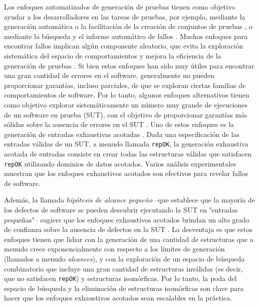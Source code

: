 Los enfoques automatizados de generación de pruebas tienen como objetivo ayudar a los desarrolladores en las tareas de pruebas, por ejemplo, mediante la generación automática o la facilitación de la creación de conjuntos de pruebas \cite{Cadar08,Luckow14,Fraser11}, o mediante la búsqueda y el informe automático de fallos \cite{Pacheco07,Ma15,Godefroid05,Marinov01,Boyapati02,Godefroid12}. Muchos enfoques para encontrar fallos implican algún componente aleatorio, que evita la exploración sistemática del espacio de comportamientos y mejora la eficiencia de la generación de pruebas \cite{Pacheco07,Ma15,Fraser11}. Si bien estos enfoques han sido muy útiles para encontrar una gran cantidad de errores en el software, generalmente no pueden proporcionar garantías, incluso parciales, de que se exploran ciertas familias de comportamientos de software. Por lo tanto, algunos enfoques alternativos tienen como objetivo explorar sistemáticamente un número muy grande de ejecuciones de un software en prueba (SUT), con el objetivo de proporcionar garantías más sólidas sobre la ausencia de errores en el SUT \cite{Marinov01,Boyapati02,Godefroid05,Godefroid18}. Uno de estos enfoques es la generación de entradas exhaustivas acotadas \cite{Marinov01,Boyapati02}. Dada una especificación de las entradas válidas de un SUT, a menudo llamada \texttt{repOK}, la generación exhaustiva acotada de entradas consiste en crear todas las estructuras válidas que satisfacen \texttt{repOK} utilizando dominios de datos acotados. Varios análisis experimentales muestran que los enfoques exhaustivos acotados son efectivos para revelar fallos de software.


Además, la llamada \emph{hipótesis de alcance pequeño} --que establece que la mayoría de los defectos de software se pueden descubrir ejecutando la SUT en "entradas pequeñas"-- sugiere que los enfoques exhaustivos acotados brindan un alto grado de confianza sobre la ausencia de defectos en la SUT \cite{Andoni02}. La desventaja es que estos enfoques tienen que lidiar con la generación de una cantidad de estructuras que a menudo crece exponencialmente con respecto a los límites de generación (llamados a menudo \emph{alcances}), y con la exploración de un espacio de búsqueda combinatorio que incluye una gran cantidad de estructuras inválidas (es decir, que no satisfacen \texttt{repOK}) y estructuras isomórficas. Por lo tanto, la poda del espacio de búsqueda y la eliminación de estructuras isomórficas son clave para hacer que los enfoques exhaustivos acotados sean escalables en la práctica.

